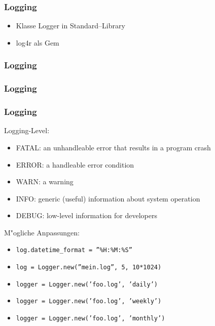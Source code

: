 \documentclass{beamer}
\begin{document}
\lstset{language=Ruby}
\lstset{basicstyle=\small,numbers=none, numberstyle=\tiny, numbersep=5pt}
\begin{frame}
  \frametitle{Logging}
  \begin{itemize}
    \item Klasse Logger in Standard--Library
    \item log4r als Gem
  \end{itemize}
\end{frame}

\begin{frame}
  \frametitle{Logging}
  
\end{frame}

\begin{frame}
  \frametitle{Logging}
  
\end{frame}

\begin{frame}
  \frametitle{Logging}
  Logging-Level:
  \begin{itemize}
    \item FATAL: an unhandleable error that results in a program crash
    \item ERROR: a handleable error condition
    \item WARN:	a warning
    \item INFO:	generic (useful) information about system operation
    \item DEBUG: low-level information for developers 
  \end{itemize}

  M"ogliche Anpassungen:
  \begin{itemize}
    \item \texttt{log.datetime\_format = ''\%H:\%M:\%S''}
    \item \texttt{log = Logger.new(''mein.log'', 5, 10*1024)}
    \item \texttt{logger = Logger.new('foo.log', 'daily')}
    \item \texttt{logger = Logger.new('foo.log', 'weekly')}
    \item \texttt{logger = Logger.new('foo.log', 'monthly')}
 
  \end{itemize}
\end{frame}

\end{document}
